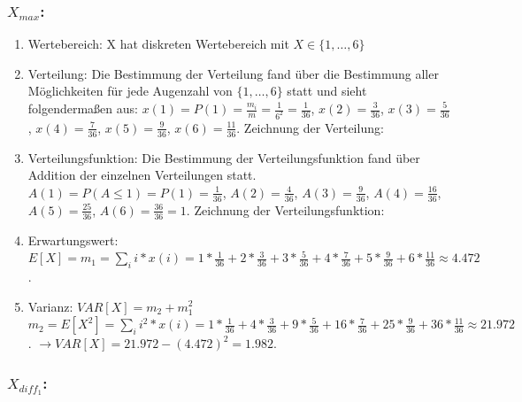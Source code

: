 \documentclass[%
10pt,              %
ngerman,           %
a4paper,           %
DIV11,             %
]{scrartcl}%
\begin{document}
\subsubsection*{$X_{max}$:}

\begin{enumerate}
	\item Wertebereich: X hat diskreten Wertebereich mit $X \in \{1, \dots, 6 \}$
	\item Verteilung: Die Bestimmung der Verteilung fand über die Bestimmung aller Möglichkeiten für jede Augenzahl von $\{1, \dots, 6 \}$ statt und sieht folgendermaßen aus:\newline
	$x(1) = P(1) = \frac{m_i}{m} = \frac{1}{6^2} = \frac{1}{36}$,\newline
	$x(2) = \frac{3}{36}$, $x(3) = \frac{5}{36}$, $x(4) = \frac{7}{36}$, $x(5) = \frac{9}{36}$, $x(6) = \frac{11}{36}$. Zeichnung der Verteilung: 
	
	\item Verteilungsfunktion: Die Bestimmung der Verteilungsfunktion fand über Addition der einzelnen Verteilungen statt.\newline
	$A(1) = P(A \leq 1) = P(1) = \frac{1}{36}$,\newline
	$A(2) = \frac{4}{36}$, $A(3) = \frac{9}{36}$, $A(4) = \frac{16}{36}$, $A(5) = \frac{25}{36}$, $A(6) = \frac{36}{36} = 1$. Zeichnung der Verteilungsfunktion: 
	
	\item Erwartungswert: $E[X] = m_1 = \sum_{i} i * x(i) = 1 * \frac{1}{36} + 2 * \frac{3}{36} + 3 * \frac{5}{36} + 4 * \frac{7}{36} + 5 * \frac{9}{36} + 6 * \frac{11}{36} \approx 4.472$.
	\item Varianz: $VAR[X] = m_2 + m_1^2$\newline
	$m_2 = E[X^2] = \sum_{i} i^2 * x(i) = 1 * \frac{1}{36} + 4 * \frac{3}{36} + 9 * \frac{5}{36} + 16 * \frac{7}{36} + 25 * \frac{9}{36} + 36 * \frac{11}{36} \approx 21.972$.\newline
	$\rightarrow VAR[X] = 21.972 - (4.472)^2 = 1.982$.
\end{enumerate}

\subsubsection*{$X_{diff_1}$:}
\end{document}
